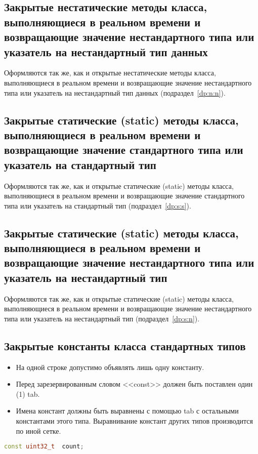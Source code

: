 \subsection{Закрытые нестатические методы класса, выполняющиеся в реальном времени и возвращающие значение нестандартного типа или указатель на нестандартный тип данных}\label{zp:n:n}
Оформляются так же, как и открытые нестатические методы класса, выполняющиеся в реальном времени и возвращающие значение нестандартного типа или указатель на нестандартный тип данных (подраздел~\ref{dp:n:n}).

\subsection{Закрытые статические (static) методы класса, выполняющиеся в реальном времени и возвращающие значение стандартного типа или указатель на стандартный тип}\label{zp:s:s}
Оформляются так же, как и открытые статические (static) методы класса, выполняющиеся в реальном времени и возвращающие значение стандартного типа или указатель на стандартный тип (подраздел~\ref{dp:s:s}).

\subsection{Закрытые статические (static) методы класса, выполняющиеся в реальном времени и возвращающие значение нестандартного типа или указатель на нестандартный тип}\label{zp:s:n}
Оформляются так же, как и открытые статические (static) методы класса, выполняющиеся в реальном времени и возвращающие значение нестандартного типа или указатель на нестандартный тип (подраздел~\ref{dp:s:n}).

\subsection{Закрытые константы класса стандартных типов}\label{zp:const:s}
\begin{itemize}
	\item На одной строке допустимо объявлять лишь одну константу.
	\item Перед зарезервированным словом <<const>> должен быть поставлен один (1) tab.
	\item Имена констант должны быть выравнены с помощью tab с остальными константами этого типа. Выравнивание констант других типов производится по иной сетке.
\end{itemize}\begin{lstlisting}[language=C++, frame=tlBR, basicstyle=\fontsize{10}{10}\ttfamily]
	const uint32_t	count;
\end{lstlisting}

